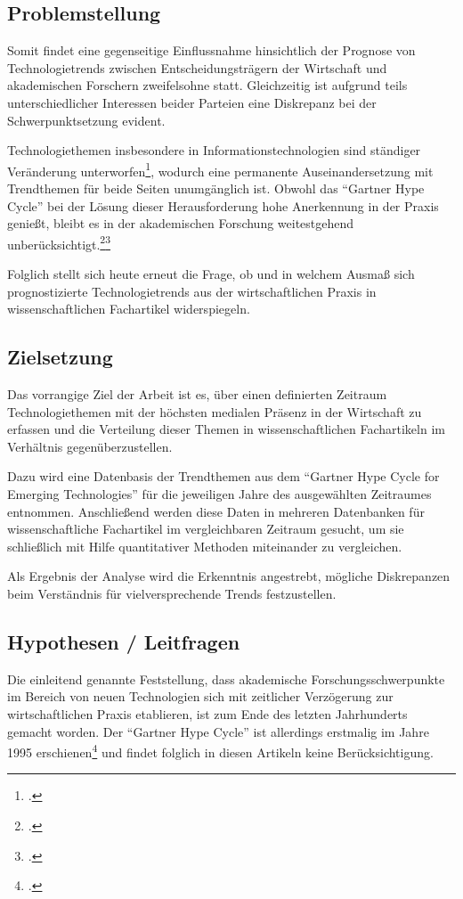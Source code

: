 \subsection{Problemstellung}
Somit findet eine gegenseitige Einflussnahme hinsichtlich der Prognose von Technologietrends zwischen Entscheidungsträgern der Wirtschaft und akademischen Forschern zweifelsohne statt. Gleichzeitig ist aufgrund teils unterschiedlicher Interessen beider Parteien eine Diskrepanz bei der Schwerpunktsetzung evident. 

Technologiethemen insbesondere in Informationstechnologien sind ständiger Veränderung unterworfen\footcite[Vgl.][S.~107f]{Chang2009}, wodurch eine permanente Auseinandersetzung mit Trendthemen für beide Seiten unumgänglich ist. Obwohl das "`Gartner Hype Cycle"' bei der Lösung dieser Herausforderung hohe Anerkennung in der Praxis genießt, bleibt es in der akademischen Forschung weitestgehend unberücksichtigt.\footcite[Vgl.][S.~241]{OLeary2008}\footcite[Vgl.][S.~12]{Jarvenpaa2008}

Folglich stellt sich heute erneut die Frage, ob und in welchem Ausmaß sich prognostizierte Technologietrends aus der wirtschaftlichen Praxis in wissenschaftlichen Fachartikel widerspiegeln.

\subsection{Zielsetzung}
Das vorrangige Ziel der Arbeit ist es, über einen definierten Zeitraum Technologiethemen mit der höchsten medialen Präsenz in der Wirtschaft zu erfassen und die Verteilung dieser Themen in wissenschaftlichen Fachartikeln im Verhältnis gegenüberzustellen.

Dazu wird eine Datenbasis der Trendthemen aus dem "`Gartner Hype Cycle for Emerging Technologies"' für die jeweiligen Jahre des ausgewählten Zeitraumes entnommen. Anschließend werden diese Daten in mehreren Datenbanken für wissenschaftliche Fachartikel im vergleichbaren Zeitraum gesucht, um sie schließlich mit Hilfe quantitativer Methoden miteinander zu vergleichen.

Als Ergebnis der Analyse wird die Erkenntnis angestrebt, mögliche Diskrepanzen beim Verständnis für vielversprechende Trends festzustellen. 

\subsection{Hypothesen / Leitfragen}
Die einleitend genannte Feststellung, dass akademische Forschungsschwerpunkte im Bereich von neuen Technologien sich mit zeitlicher Verzögerung zur wirtschaftlichen Praxis etablieren, ist zum Ende des letzten Jahrhunderts gemacht worden. Der "`Gartner Hype Cycle"' ist allerdings erstmalig im Jahre 1995 erschienen\footcite[Vgl.][S.~241]{OLeary2008} und findet folglich in diesen Artikeln keine Berücksichtigung.

